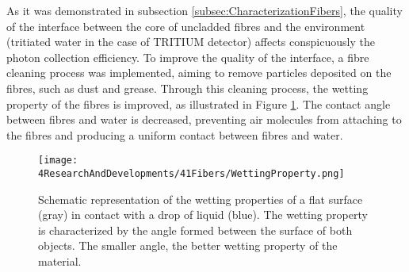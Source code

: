 
As it was demonstrated in subsection \ref{subsec:CharacterizationFibers}, the quality of the interface between the core of uncladded fibres and the environment (tritiated water in the case of TRITIUM detector) affects conspicuously the photon collection efficiency. To improve the quality of the interface, a fibre cleaning process was implemented, aiming to remove particles deposited on the fibres, such as dust and grease.  Through this cleaning process, the wetting property of the fibres is improved, as illustrated in Figure \ref{fig:WettingProperty}. The contact angle between fibres and water is decreased, preventing air molecules from attaching to the fibres and producing a uniform contact between fibres and water.
\begin{figure}[h]
\centering
\texttt{[image: 4ResearchAndDevelopments/41Fibers/WettingProperty.png]}
\caption{Schematic representation of the wetting properties of a flat surface (gray) in contact with a drop of liquid (blue). The wetting property is characterized by the angle formed between the surface of both objects. The smaller angle, the better wetting property of the material. \cite{WettingProperty}\label{fig:WettingProperty}}
\end{figure}

